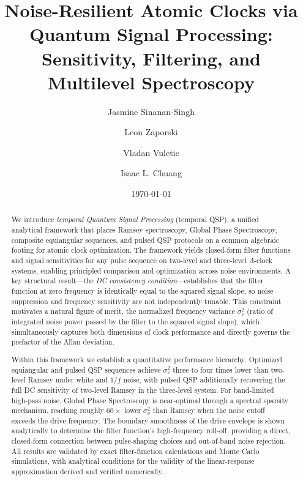 \documentclass[aps,pra,twocolumn,superscriptaddress,longbibliography]{revtex4-2}
\begin{document}
\title{Noise-Resilient Atomic Clocks via Quantum Signal Processing:\\
       Sensitivity, Filtering, and Multilevel Spectroscopy}

\author{Jasmine Sinanan-Singh}
\author{Leon Zaporski}
\author{Vladan Vuletic}
\author{Isaac L. Chuang}

\date{\today}

\begin{abstract}

We introduce \emph{temporal Quantum Signal Processing} (temporal QSP), a unified
analytical framework that places Ramsey spectroscopy, Global Phase Spectroscopy,
composite equiangular sequences, and pulsed QSP protocols on a common algebraic
footing for atomic clock optimization.
The framework yields closed-form filter functions and signal sensitivities for any
pulse sequence on two-level and three-level $\Lambda$-clock systems, enabling
principled comparison and optimization across noise environments.
A key structural result---the \emph{DC consistency condition}---establishes that the
filter function at zero frequency is identically equal to the squared signal slope,
so noise suppression and frequency sensitivity are not independently tunable.
This constraint motivates a natural figure of merit, the normalized frequency variance
$\sigma^2_\nu$ (ratio of integrated noise power passed by the filter to the squared
signal slope), which simultaneously captures both dimensions of clock performance and
directly governs the prefactor of the Allan deviation.

Within this framework we establish a quantitative performance hierarchy.
Optimized equiangular and pulsed QSP sequences achieve $\sigma^2_\nu$ three to four
times lower than two-level Ramsey under white and $1/f$ noise, with pulsed QSP
additionally recovering the full DC sensitivity of two-level Ramsey in the three-level
system.
For band-limited high-pass noise, Global Phase Spectroscopy is near-optimal through
a spectral sparsity mechanism, reaching roughly $60\times$ lower $\sigma^2_\nu$ than
Ramsey when the noise cutoff exceeds the drive frequency.
The boundary smoothness of the drive envelope is shown analytically to determine
the filter function's high-frequency roll-off, providing a direct, closed-form
connection between pulse-shaping choices and out-of-band noise rejection.
All results are validated by exact filter-function calculations and Monte Carlo
simulations, with analytical conditions for the validity of the linear-response
approximation derived and verified numerically.

\end{abstract}
\end{document}
